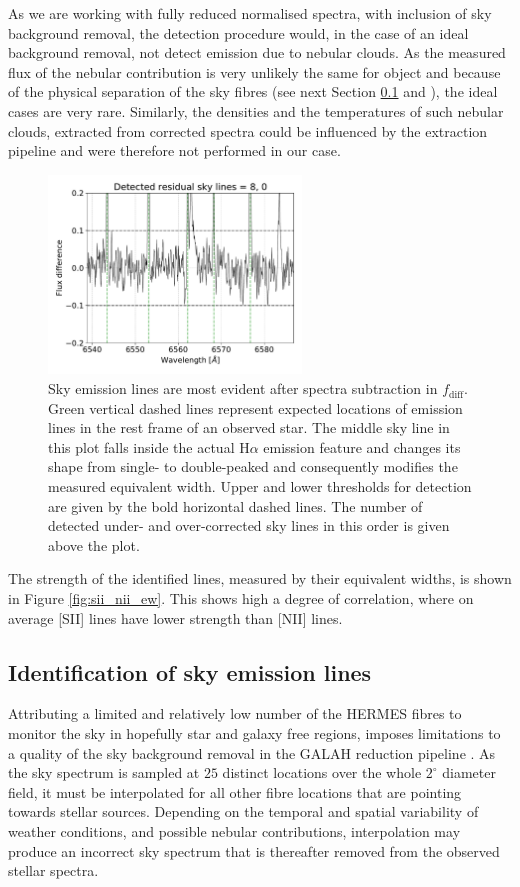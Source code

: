 As we are working with fully reduced normalised spectra, with inclusion of sky background removal, the detection procedure would, in the case of an ideal background removal, not detect emission due to nebular clouds. As the measured flux of the nebular contribution is very unlikely the same for object and because of the physical separation of the sky fibres (see next Section \ref{sec:skyemis} and \citet{2017MNRAS.464.1259K}), the ideal cases are very rare. Similarly, the densities and the temperatures of such nebular clouds, extracted from corrected spectra could be influenced by the extraction pipeline and were therefore not performed in our case. 

\begin{figure}
	\centering
	\includegraphics[width=0.6\textwidth]{paper_170509002201287_2.pdf}
	\caption{Sky emission lines are most evident after spectra subtraction in $f_\mathrm{diff}$. Green vertical dashed lines represent expected locations of emission lines in the rest frame of an observed star. The middle sky line in this plot falls inside the actual H$\alpha$ emission feature and changes its shape from single- to double-peaked and consequently modifies the measured equivalent width. Upper and lower thresholds for detection are given by the bold horizontal dashed lines. The number of detected under- and over-corrected sky lines in this order is given above the plot.}
	\label{fig:skyemiss}
\end{figure}

The strength of the identified lines, measured by their equivalent widths, is shown in Figure \ref{fig:sii_nii_ew}. This shows high a degree of correlation, where on average [SII] lines have lower strength than [NII] lines.

\subsection{Identification of sky emission lines}
\label{sec:skyemis}
Attributing a limited and relatively low number of the HERMES fibres to monitor the sky in hopefully star and galaxy free regions, imposes limitations to a quality of the sky background removal in the GALAH reduction pipeline \citep{2017MNRAS.464.1259K}. As the sky spectrum is sampled at $25$ distinct locations over the whole $2^\circ$ diameter field, it must be interpolated for all other fibre locations that are pointing towards stellar sources. Depending on the temporal and spatial variability of weather conditions, and possible nebular contributions, interpolation may produce an incorrect sky spectrum that is thereafter removed from the observed stellar spectra.

